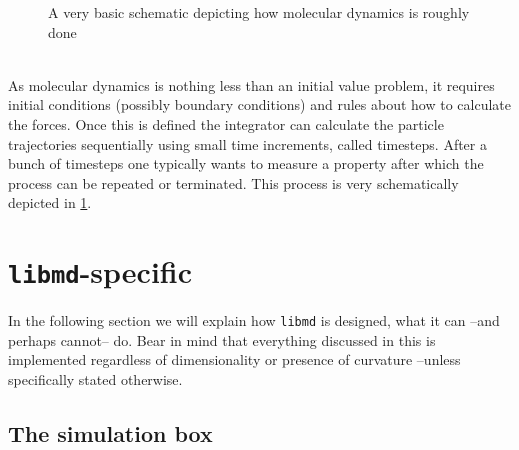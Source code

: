 \documentclass[11pt,a4paper,oneside]{report}
\renewcommand{\theequation}{\arabic{section}.\arabic{equation}}
\newcommand{\subsect}[1]{\subsection{#1} \setcounter{equation}{0}}
\newcommand{\sect}[1]{\section{#1}  \setcounter{equation}{0}}
\begin{document}
\begin{figure}
	\begin{center}
  \end{center}
  \caption{A very basic schematic depicting how molecular dynamics is roughly done}
  \label{fig:md} 
\end{figure}
\\
As molecular dynamics is nothing less than an initial value problem, it requires initial conditions (possibly boundary conditions) and rules about how to calculate the forces. Once this is defined the integrator can calculate the particle trajectories sequentially using small time increments, called timesteps. After a bunch of timesteps one typically wants to measure a property after which the process can be repeated or terminated. This process is very schematically depicted in \cref{fig:md}.  
\sect{\texttt{libmd}-specific} 
\renewcommand{\theequation}{\arabic{section}.\alph{subsection}.\arabic{equation}}
In the following section we will explain how \texttt{libmd} is designed, what it can --and perhaps cannot-- do. Bear in mind that everything discussed in this is implemented regardless of dimensionality or presence of curvature --unless specifically stated otherwise.
\subsect{The simulation box}
\end{document}
